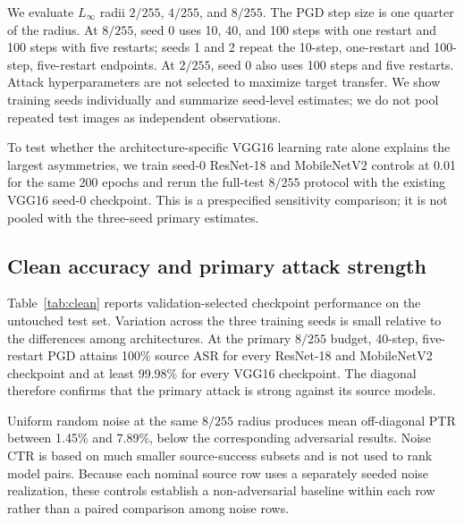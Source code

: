 \documentclass[10pt,twocolumn]{article}
\begin{document}
We evaluate $L_\infty$ radii $2/255$, $4/255$, and $8/255$. The PGD step size is one quarter of the radius. At $8/255$, seed 0 uses 10, 40, and 100 steps with one restart and 100 steps with five restarts; seeds 1 and 2 repeat the 10-step, one-restart and 100-step, five-restart endpoints. At $2/255$, seed 0 also uses 100 steps and five restarts. Attack hyperparameters are not selected to maximize target transfer. We show training seeds individually and summarize seed-level estimates; we do not pool repeated test images as independent observations.

To test whether the architecture-specific VGG16 learning rate alone explains the largest asymmetries, we train seed-0 ResNet-18 and MobileNetV2 controls at 0.01 for the same 200 epochs and rerun the full-test $8/255$ protocol with the existing VGG16 seed-0 checkpoint. This is a prespecified sensitivity comparison; it is not pooled with the three-seed primary estimates.

\subsection{Clean accuracy and primary attack strength}
Table~\ref{tab:clean} reports validation-selected checkpoint performance on the untouched test set. Variation across the three training seeds is small relative to the differences among architectures. At the primary $8/255$ budget, 40-step, five-restart PGD attains 100\% source ASR for every ResNet-18 and MobileNetV2 checkpoint and at least 99.98\% for every VGG16 checkpoint. The diagonal therefore confirms that the primary attack is strong against its source models.

Uniform random noise at the same $8/255$ radius produces mean off-diagonal PTR between 1.45\% and 7.89\%, below the corresponding adversarial results. Noise CTR is based on much smaller source-success subsets and is not used to rank model pairs. Because each nominal source row uses a separately seeded noise realization, these controls establish a non-adversarial baseline within each row rather than a paired comparison among noise rows.

\begin{table}[t]
\centering
\caption{Clean test accuracy (\%) by training seed. The final column is the mean and sample standard deviation over three checkpoints.}
\label{tab:clean}
\end{table}
\end{document}
